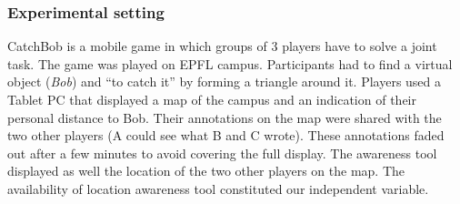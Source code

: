 \documentclass[twocolumn]{article}
\begin{document}
\subsubsection*{Experimental setting}

{\sc CatchBob} is a mobile game in which groups of 3 players have to solve a
joint task. The game was played on EPFL campus. Participants had to find a
virtual object (\emph{Bob}) and ``to catch it'' by forming a triangle around it.
Players used a Tablet PC that displayed a map of the campus and an indication of
their personal distance to Bob. Their annotations on the map were shared with
the two other players (A could see what B and C wrote). These annotations faded
out after a few minutes to avoid covering the full display. The awareness tool
displayed as well the location of the two other players on the map. The
availability of location awareness tool constituted our independent variable.
\end{document}
